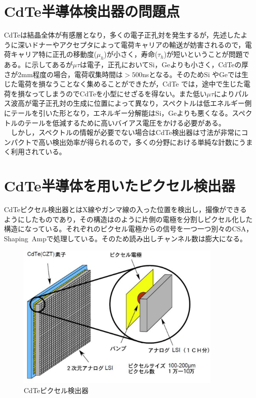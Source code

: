 \section{CdTe半導体検出器の問題点}
CdTeは結晶全体が有感層となり，多くの電子正孔対を発生するが，先述したように深いドナーやアクセプタによって電荷キャリアの輸送が妨害されるので，電荷キャリア特に正孔の移動度($\mu_h$)が小さく，寿命($\tau_h$)が短いということが問題である。に示してあるが$\mu\tau$は電子，正孔においてSi，Geよりも小さく，CdTeの厚さが2mm程度の場合，電荷収集時間は$>500$nsとなる。そのためSi やGeでは生じた電荷を損なうことなく集めることができたが，CdTe では，途中で生じた電荷を損なってしまうのでCdTeを小型にせざるを得ない。また低い$\mu\tau$によりパルス波高が電子正孔対の生成に位置によって異なり，スペクトルは低エネルギー側にテールを引いた形となり，エネルギー分解能はSi，Geよりも悪くなる。スペクトルのテールを低減するために高いバイアス電圧をかける必要がある。\\
\ \ しかし，スペクトルの情報が必要でない場合はCdTe検出器は寸法が非常にコンパクトで高い検出効率が得られるので，多くの分野における単純な計数にうまく利用されている。

%

\section{CdTe半導体を用いたピクセル検出器}
CdTeピクセル検出器とはX線やガンマ線の入った位置を検出し，撮像ができるようにしたものであり，その構造はのように片側の電極を分割しピクセル化した構造になっている。それぞれのピクセル電極からの信号を一つ一つ別々のCSA，Shaping\ Ampで処理している。そのため読み出しチャンネル数は膨大になる。

\begin{figure}[H]
 \begin{center}
 \includegraphics[width=10cm]{image/other/CdTe_pixel.eps}
 \end{center}
 \caption{CdTeピクセル検出器\cite{takahashi}}
 \label{fig:pixel_CdTe}
\end{figure}

%
\fi


